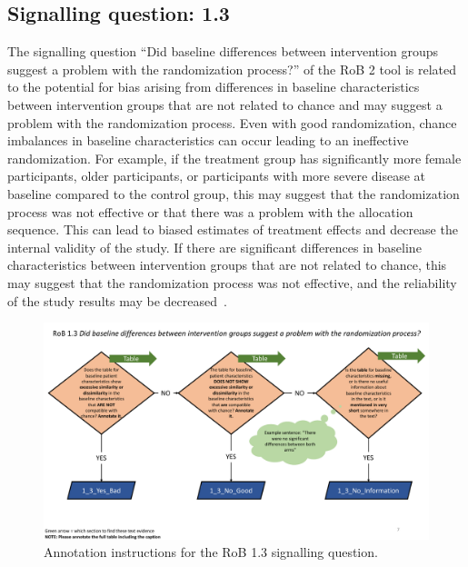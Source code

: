 \documentclass[sn-mathphys,Numbered]{sn-jnl}%
\begin{document}
\subsection*{Signalling question: 1.3}
%
The signalling question ``Did baseline differences between intervention groups suggest a problem with the randomization process?'' of the RoB 2 tool is related to the potential for bias arising from differences in baseline characteristics between intervention groups that are not related to chance and may suggest a problem with the randomization process.
Even with good randomization, chance imbalances in baseline characteristics can occur leading to an ineffective randomization.
For example, if the treatment group has significantly more female participants, older participants, or participants with more severe disease at baseline compared to the control group, this may suggest that the randomization process was not effective or that there was a problem with the allocation sequence.
This can lead to biased estimates of treatment effects and decrease the internal validity of the study.
If there are significant differences in baseline characteristics between intervention groups that are not related to chance, this may suggest that the randomization process was not effective, and the reliability of the study results may be decreased~\cite{roberts1999baseline}.


%
%
%
\begin{figure}[hbt]
    \centering
    \includegraphics[width=\textwidth]{figures/1_3.pdf}
    \caption{Annotation instructions for the RoB 1.3 signalling question.}
    \label{fig:1_3}
\end{figure}
%
%
%
\end{document}
